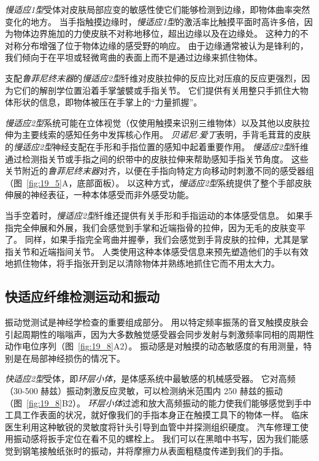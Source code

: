 \textit{慢适应1型}受体对皮肤局部应变的敏感性使它们能够检测到边缘，即物体曲率突然变化的地方。
当手指触摸边缘时，\textit{慢适应1型}的激活率比触摸平面时高许多倍，因为物体边界施加的力使皮肤不对称地移位，超出边缘以及在边缘处。
这种力的不对称分布增强了位于物体边缘的感受野的响应。
由于边缘通常被认为是锋利的，我们倾向于在平坦或轻微弯曲的表面上而不是通过边缘来抓住物体。


支配\textit{鲁菲尼终末器}的\textit{慢适应2型}纤维对皮肤拉伸的反应比对压痕的反应更强烈，因为它们的解剖学位置沿着手掌皱襞或手指关节。
它们提供有关用整只手抓住大物体形状的信息，即物体被压在手掌上的“力量抓握”。


\textit{慢适应2型}系统可能在立体视觉（仅使用触摸来识别三维物体）以及其他以皮肤拉伸为主要线索的感知任务中发挥核心作用。
\textit{贝诺尼$\cdot$爱丁}表明，手背毛茸茸的皮肤的\textit{慢适应2型}神经支配在手形和手指位置的感知中起着重要作用。
\textit{慢适应2型}纤维通过检测指关节或手指之间的织带中的皮肤拉伸来帮助感知手指关节角度。
这些关节附近的\textit{鲁菲尼终末器}对齐，以便在手指向特定方向移动时刺激不同的感受器组（图~\ref{fig:19_5}A，底部面板）。
以这种方式，\textit{慢适应2型}系统提供了整个手部皮肤伸展的神经表征，一种本体感受而非外感受功能。


当手空着时，\textit{慢适应2型}纤维还提供有关手形和手指运动的本体感受信息。
如果手指完全伸展和外展，我们会感觉到手掌和近端指骨的拉伸，因为无毛的皮肤变平了。
同样，如果手指完全弯曲并握拳，我们会感觉到手背皮肤的拉伸，尤其是掌指关节和近端指间关节。
人类使用这种本体感受信息来预先塑造他们的手以有效地抓住物体，将手指张开到足以清除物体并熟练地抓住它而不用太大力。



\subsection{快适应纤维检测运动和振动}

振动觉测试是神经学检查的重要组成部分。
用以特定频率振荡的音叉触摸皮肤会引起周期性的嗡嗡声，因为大多数触觉感受器会同步发射与刺激频率同相的周期性动作电位序列（图~\ref{fig:19_8}A2）。
振动感是对触摸的动态敏感度的有用测量，特别是在局部神经损伤的情况下。


\textit{快适应2型}受体，即\textit{环层小体}，是体感系统中最敏感的机械感受器。
它对高频（30-500 赫兹）振动刺激反应灵敏，可以检测纳米范围内 250 赫兹的振动（图~\ref{fig:19_8}B2）。
\textit{环层小体}过滤和放大高频振动的能力使我们能够感觉到手中工具工作表面的状况，就好像我们的手指本身正在触摸工具下的物体一样。
临床医生利用这种敏锐的灵敏度将针头引导到血管中并探测组织硬度。
汽车修理工使用振动感将扳手定位在看不见的螺栓上。
我们可以在黑暗中书写，因为我们能感觉到钢笔接触纸张时的振动，并将摩擦力从表面粗糙度传递到我们的手指。


